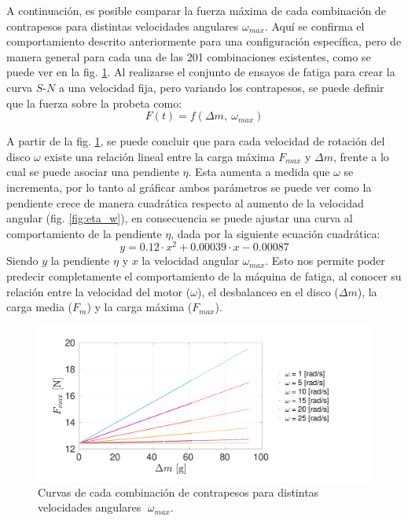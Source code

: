 A continuación, es posible comparar la fuerza máxima de cada combinación de contrapesos para distintas velocidades angulares $\omega_{max}$. Aquí se confirma el comportamiento descrito anteriormente para una configuración específica, pero de manera general para cada una de las 201 combinaciones existentes, como se puede ver en la fig. \ref{fig:fmax_dm}. Al realizarse el conjunto de ensayos de fatiga para crear la curva $S$-$N$ a una velocidad fija, pero variando los contrapesos, se puede definir que la fuerza sobre la probeta como:
\begin{equation}\label{eq:func_psiomega}
	F(t) = f(\Delta m,\: \omega_{max})
\end{equation}

A partir de la fig. \ref{fig:fmax_dm}, se puede concluir que para cada velocidad de rotación del disco $\omega$ existe una relación lineal entre la carga máxima $F_{max}$ y $\Delta m$, frente a lo cual se puede asociar una pendiente $\eta$. Esta aumenta a medida que $\omega$ se incrementa, por lo tanto al gráficar ambos parámetros se puede ver como la pendiente crece de manera cuadrática respecto al aumento de la velocidad angular (fig. \ref{fig:eta_w}), en consecuencia se puede ajustar una curva al comportamiento de la pendiente $\eta$, dada por la siguiente ecuación cuadrática:
\begin{equation}
	y = 0.12\cdot x^2 + 0.00039\cdot x - 0.00087
\end{equation}
Siendo $y$ la pendiente $\eta$ y $x$ la velocidad angular $\omega_{max}$. Esto nos permite poder predecir completamente el comportamiento de la máquina de fatiga, al conocer su relación entre la velocidad del motor ($\omega$), el desbalanceo en el disco ($\Delta m$), la carga media ($F_m$) y la carga máxima ($F_{max}$).

\begin{figure}
\centering
\includegraphics[width=1\linewidth, trim={1cm 0cm 4cm 1cm}, clip]{Imagenes/fmax_dm2.pdf}
\caption{Curvas de cada combinación de contrapesos para distintas velocidades angulares $\; \omega_{max}$.}
\label{fig:fmax_dm}
\end{figure}

